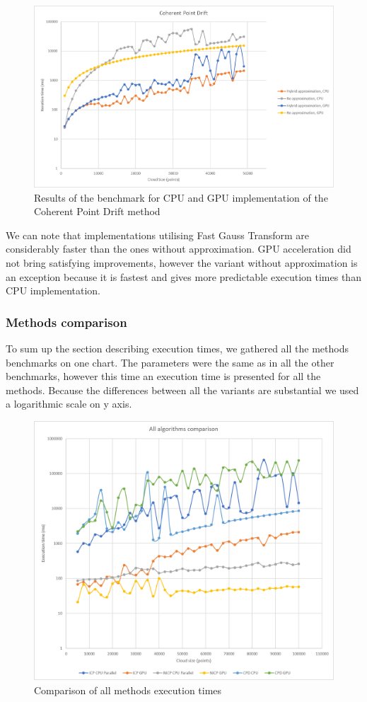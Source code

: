 \documentclass[titlepage]{article}
\begin{document}
\begin{figure}[H]
\includegraphics[width=\textwidth]{ms-cpd-3.png}
\caption{Results of the benchmark for CPU and GPU implementation of the Coherent Point Drift method}
\end{figure}

We can note that implementations utilising Fast Gauss Transform are considerably faster than the ones without approximation. GPU acceleration did not bring satisfying improvements, however the variant without approximation is an exception because it is fastest and gives more predictable execution times than CPU implementation.

\subsubsection{Methods comparison}

To sum up the section describing execution times, we gathered all the methods benchmarks on one chart. The parameters were the same as in all the other benchmarks, however this time an execution time is presented for all the methods. Because the differences between all the variants are substantial we used a logarithmic scale on y axis.

\begin{figure}[H]
\includegraphics[width=\textwidth]{ms-all.png}
\caption{Comparison of all methods execution times}
\end{figure}
\end{document}
